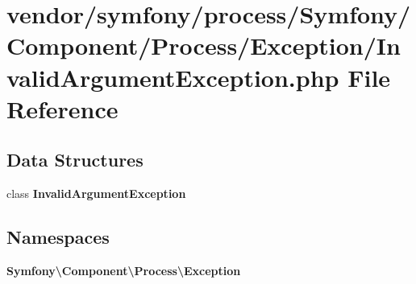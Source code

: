 \section{vendor/symfony/process/\+Symfony/\+Component/\+Process/\+Exception/\+Invalid\+Argument\+Exception.php File Reference}
\label{symfony_2process_2_symfony_2_component_2_process_2_exception_2_invalid_argument_exception_8php}
\subsection*{Data Structures}
\begin{DoxyCompactItemize}
\item 
class {\bf Invalid\+Argument\+Exception}
\end{DoxyCompactItemize}
\subsection*{Namespaces}
\begin{DoxyCompactItemize}
\item 
 {\bf Symfony\textbackslash{}\+Component\textbackslash{}\+Process\textbackslash{}\+Exception}
\end{DoxyCompactItemize}
